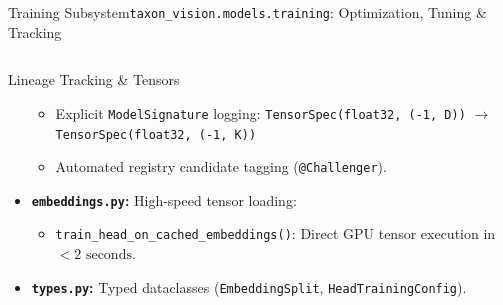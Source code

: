 \begin{frame}{Training Subsystem}{\texttt{taxon\_vision.models.training}: Optimization, Tuning \& Tracking}
\begin{columns}[T]
\begin{column}{0.48\textwidth}
\begin{block}{Lineage Tracking \& Tensors}
\begin{itemize}
\begin{itemize}
                            \item Explicit \texttt{ModelSignature} logging:
                                \texttt{TensorSpec(float32, (-1, D))} $\to$ \newline
                                \texttt{TensorSpec(float32, (-1, K))}
                            \item Automated registry candidate tagging (\texttt{@Challenger}).
                        \end{itemize}
                    \item \textbf{\texttt{embeddings.py}:} High-speed tensor loading:
                        \begin{itemize}\tiny
                            \item \texttt{train\_head\_on\_cached\_embeddings()}: Direct GPU tensor execution in $< 2\text{ seconds}$.
                        \end{itemize}
                    \item \textbf{\texttt{types.py}:} Typed dataclasses (\texttt{EmbeddingSplit}, \texttt{HeadTrainingConfig}).
                \end{itemize}
            \end{block}
        \end{column}
    \end{columns}


\end{frame}


